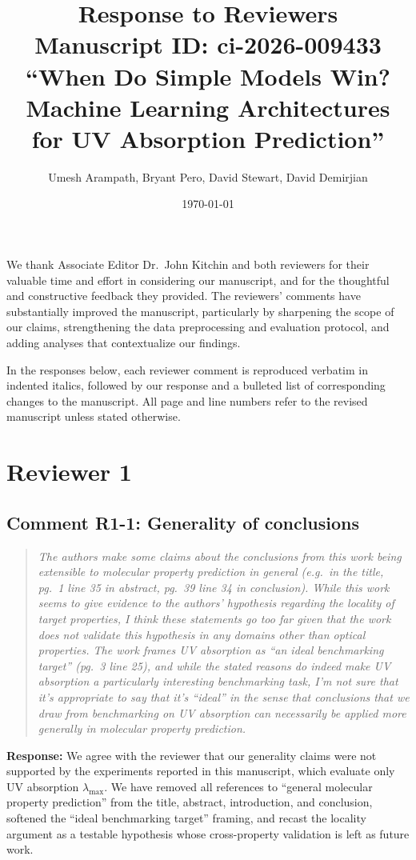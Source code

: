 \documentclass[11pt]{article}
\title{Response to Reviewers\\
\large Manuscript ID: ci-2026-009433\\
``When Do Simple Models Win? Machine Learning Architectures for UV Absorption Prediction''}
\author{Umesh Arampath, Bryant Pero, David Stewart, David Demirjian}
\date{\today}
\newenvironment{reviewer}{%
  \begin{quote}\itshape\color{black!70}}{%
  \end{quote}}
\newcommand{\response}[1]{\noindent\textbf{Response:} #1\par\medskip}
\begin{document}
\maketitle

We thank Associate Editor Dr.\ John Kitchin and both reviewers for their valuable time and effort in considering our manuscript, and for the thoughtful and constructive feedback they provided. The reviewers' comments have substantially improved the manuscript, particularly by sharpening the scope of our claims, strengthening the data preprocessing and evaluation protocol, and adding analyses that contextualize our findings.

In the responses below, each reviewer comment is reproduced verbatim in indented italics, followed by our response and a bulleted list of corresponding changes to the manuscript. All page and line numbers refer to the revised manuscript unless stated otherwise.


\clearpage

\section*{Reviewer 1}

\subsection*{Comment R1-1: Generality of conclusions}
\begin{reviewer}
The authors make some claims about the conclusions from this work being extensible to molecular property prediction in general (e.g.\ in the title, pg.\ 1 line 35 in abstract, pg.\ 39 line 34 in conclusion). While this work seems to give evidence to the authors' hypothesis regarding the locality of target properties, I think these statements go too far given that the work does not validate this hypothesis in any domains other than optical properties. The work frames UV absorption as ``an ideal benchmarking target'' (pg.\ 3 line 25), and while the stated reasons do indeed make UV absorption a particularly interesting benchmarking task, I'm not sure that it's appropriate to say that it's ``ideal'' in the sense that conclusions that we draw from benchmarking on UV absorption can necessarily be applied more generally in molecular property prediction.
\end{reviewer}

\response{We agree with the reviewer that our generality claims were not supported by the experiments reported in this manuscript, which evaluate only UV absorption $\lambda_{\max}$. We have removed all references to ``general molecular property prediction'' from the title, abstract, introduction, and conclusion, softened the ``ideal benchmarking target'' framing, and recast the locality argument as a testable hypothesis whose cross-property validation is left as future work.}
\end{document}

